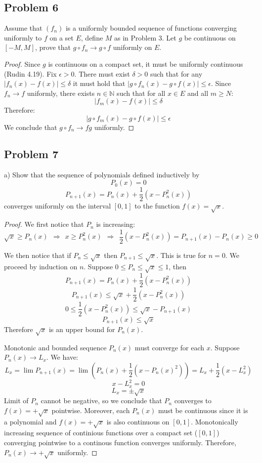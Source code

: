 \documentclass{article}
\begin{document}
\subsection*{Problem 6}

\begin{tcolorbox}
Assume that $(f_n)$ is a uniformly bounded sequence of functions converging uniformly to $f$ on a set $E$, define $M$ as in Problem 3. Let $g$ be continuous on $[-M, M]$, prove that $g \circ f_n \to g \circ f$ uniformly on $E$.
\end{tcolorbox}
\begin{proof}
Since $g$ is continuous on a compact set, it must be uniformly continuous (Rudin 4.19). Fix $\epsilon>0$. There must exist $\delta>0$ such that for any $|f_n(x)-f(x)| \leq \delta$ it must hold that $|g \circ f_n(x)-g \circ f(x)| \leq \epsilon$. Since $f_n \to f$ uniformly, there exists $n \in \mathbb{N}$ such that for all $x \in E$ and all $m \geq N$:
$$ |f_m(x)-f(x)| \leq \delta $$
Therefore:
$$ |g \circ f_m(x)-g \circ f(x)| \leq \epsilon $$
We conclude that $g \circ f_n \to f g$ uniformly.
\end{proof}


\subsection*{Problem 7}

\begin{tcolorbox}
a) Show that the sequence of polynomials defined inductively by
$$ P_0(x) = 0 $$ 
$$ P_{n+1}(x) = P_n(x) + \frac{1}{2} \left( x-P_n^2(x) \right) $$
converges uniformly on the interval $[0, 1]$ to the function $f(x) = \sqrt{x}$.
\end{tcolorbox}
\begin{proof}
We first notice that $P_n$ is increasing:
$$ \sqrt{x} \geq P_n(x) \>\> \Rightarrow \>\> x \geq P_n^2(x) \>\> \Rightarrow \>\> \frac{1}{2} \left( x - P_n^2(x) \right) = P_{n+1}(x) - P_n(x) \geq 0 $$

We then notice that if $P_n \leq \sqrt{x}$ then $P_{n+1} \leq \sqrt{x}$. This is true for $n=0$. We proceed by induction on $n$. Suppose $0 \leq P_n \leq \sqrt{x} \leq 1$, then
$$ P_{n+1}(x) = P_n(x) + \frac{1}{2} \left( x-P_n^2(x) \right) $$
$$ P_{n+1}(x) \leq \sqrt{x} + \frac{1}{2} \left( x-P_n^2(x) \right) $$
$$ 0 \leq \frac{1}{2} \left( x-P_n^2(x) \right) \leq \sqrt{x} - P_{n+1}(x) $$
$$ P_{n+1}(x) \leq \sqrt{x} $$
Therefore $\sqrt{x}$ is an upper bound for $P_n(x)$.

Monotonic and bounded sequence $P_n(x)$ must converge for each $x$. Suppose $P_n(x) \to L_x$. We have:
$$ L_x =  \lim P_{n+1}(x) = \lim \left( P_n(x) + \frac{1}{2} ( x - P_n(x)^2 ) \right) = L_x + \frac{1}{2} ( x - L_x^2 ) $$
$$ x - L_x^2 = 0 $$
$$ L_x = \pm \sqrt{x} $$
Limit of $P_n$ cannot be negative, so we conclude that $P_n$ converges to $f(x) = +\sqrt{x}$ pointwise. Moreover, each $P_n(x)$ must be continuous since it is a polynomial and $f(x) = +\sqrt{x}$ is also continuous on $[0,1]$. Monotonically increasing sequence of continious functions over a compact set ($[0,1]$) converging pointwise to a continous function converges uniformly. Therefore, $P_n(x) \to +\sqrt{x}$ uniformly.
\end{proof}
\end{document}
